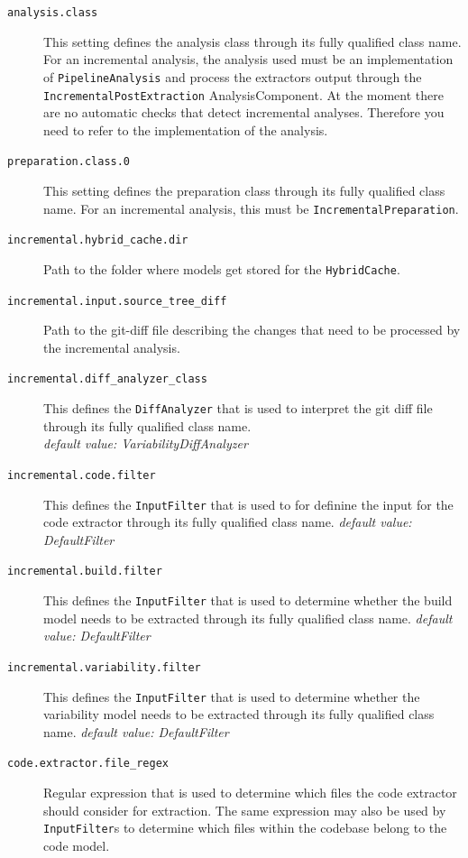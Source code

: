 \documentclass[a4paper]{article}
\begin{document}
\begin{description}
	\item[\texttt{analysis.class}] This setting defines the analysis class through its fully qualified class name. For an incremental analysis, the analysis used must be an implementation of \texttt{PipelineAnalysis} and process the extractors output through the \texttt{IncrementalPostExtraction} AnalysisComponent. At the moment there are no automatic checks that detect incremental analyses. Therefore you need to refer to the implementation of the analysis.
	\item[\texttt{preparation.class.0}] This setting defines the preparation class through its fully qualified class name. For an incremental analysis, this must be \texttt{IncrementalPreparation}. \\
	\item[\texttt{incremental.hybrid\_cache.dir}] Path to the folder where models get stored for the \texttt{HybridCache}.
	\item[\texttt{incremental.input.source\_tree\_diff}] Path to the git-diff file describing the changes that need to be processed by the incremental analysis.
	\item[\texttt{incremental.diff\_analyzer\_class}] This defines the \texttt{DiffAnalyzer} that is used to interpret the git diff file through its fully qualified class name. \\
	    \emph{default value: VariabilityDiffAnalyzer}
	\item[\texttt{incremental.code.filter}] This defines the \texttt{InputFilter} that is used to for definine the input for the code extractor through its fully qualified class name. 
	    \emph{default value: DefaultFilter}
	\item[\texttt{incremental.build.filter}] This defines the \texttt{InputFilter} that is used to determine whether the build model needs to be extracted through its fully qualified class name.
	    \emph{default value: DefaultFilter} 
	\item[\texttt{incremental.variability.filter}] This defines the \texttt{InputFilter} that is used to determine whether the variability model needs to be extracted through its fully qualified class name. 
	    \emph{default value: DefaultFilter}
	\item[\texttt{code.extractor.file\_regex}] Regular expression that is used to determine which files the code extractor should consider for extraction. The same expression may also be used by \texttt{InputFilter}s to determine which files within the codebase belong to the code model. \\

\end{description}
\end{document}
